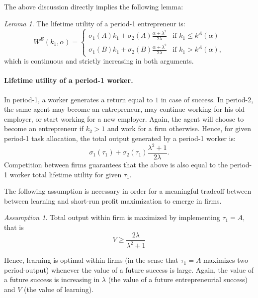 \documentclass[12pt,american]{paper}
\theoremstyle{remark}
\newtheorem{ass}{Assumption}
\newtheorem{lemma}{Lemma}
\begin{document}
The above discussion directly implies the following lemma:
\begin{lemma}
The lifetime utility of a period-1 entrepreneur is:
\begin{equation}\label{eq: value entrepreneur}
W^E(k_1,\alpha)=\begin{cases}
\sigma_1(A) k_1+  \sigma_2(A)  \frac{ \alpha+\lambda^2}{2\lambda} &\mbox{if } k_1\leq k^A(\alpha) \\
\sigma_1(B) k_1+  \sigma_2(B)  \frac{ \alpha+\lambda^2}{2\lambda} &\mbox{if } k_1 > k^A(\alpha), 
\end{cases}
\end{equation}
which is continuous and strictly increasing in both arguments.
\end{lemma}









\paragraph{Lifetime utility of a period-1 worker.}
In period-1, a worker generates a return equal to $1$ in case of success. In period-2, the same agent may become an entrepreneur, may continue working for his old employer, or start working for a new employer. Again, the agent will choose to become an entrepreneur if $k_2>1$ and work for a firm otherwise. Hence, for given period-1 task allocation, the total output generated by a period-1 worker is:
\[
\sigma_1(\tau_1)+\sigma_2(\tau_1)\frac{\lambda^2+1 }{2\lambda}.
\]
Competition between firms guarantees that the above is also equal to the period-1 worker total lifetime utility for given $\tau_1$. 

The following assumption is necessary in order for a meaningful tradeoff between  between learning and short-run profit maximization to emerge in firms.
\begin{ass}\label{ass: necessary for learning}
Total output within firm is maximized by implementing $\tau_1=A$, that is
\begin{equation}
V \geq \frac{2\lambda }{\lambda^2+1}
\end{equation}
\end{ass}
Hence, learning is optimal within firms (in the sense that $\tau_1=A$ maximizes two period-output) whenever the value of a future success is large. Again, the value of a future success is increasing in  $\lambda$ (the value of a future  entrepreneurial success) and  $V$ (the value  of learning). 
\end{document}
